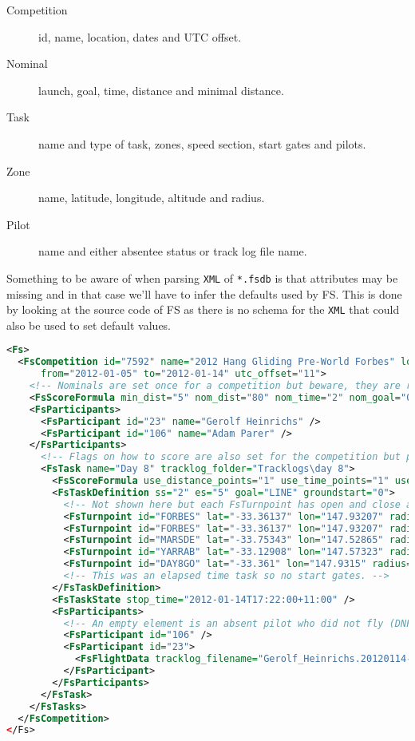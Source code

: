 \documentclass[gap.tex]{subfiles}
\begin{document}
\begin{description}
    \item[Competition] id, name, location, dates and UTC offset.
    \item[Nominal] launch, goal, time, distance and minimal distance.
    \item[Task] name and type of task, zones, speed section, start gates and pilots.
    \item[Zone] name, latitude, longitude, altitude and radius.
    \item[Pilot] name and either absentee status or track log file name.
\end{description}

Something to be aware of when parsing \texttt{XML} of \texttt{*.fsdb} is that
attributes may be missing and in that case we'll have to infer the defaults
used by FS. This is done by looking at the source code of FS as there is no
schema for the \texttt{XML} that could also be used to set default values.

\begin{lstlisting}[language=XML, caption={Overall *.fsdb structure, filtered for input.}]
<Fs>
  <FsCompetition id="7592" name="2012 Hang Gliding Pre-World Forbes" location="Forbes, Australia"
      from="2012-01-05" to="2012-01-14" utc_offset="11">
    <!-- Nominals are set once for a competition but beware, they are repeated per task. -->
    <FsScoreFormula min_dist="5" nom_dist="80" nom_time="2" nom_goal="0.2" />
    <FsParticipants>
      <FsParticipant id="23" name="Gerolf Heinrichs" />
      <FsParticipant id="106" name="Adam Parer" />
    </FsParticipants>
      <!-- Flags on how to score are also set for the competition but pick them up from the task. -->
      <FsTask name="Day 8" tracklog_folder="Tracklogs\day 8">
        <FsScoreFormula use_distance_points="1" use_time_points="1" use_departure_points="0" use_leading_points="1" use_arrival_position_points="1" use_arrival_time_points="0" />
        <FsTaskDefinition ss="2" es="5" goal="LINE" groundstart="0">
          <!-- Not shown here but each FsTurnpoint has open and close attributes. -->
          <FsTurnpoint id="FORBES" lat="-33.36137" lon="147.93207" radius="100" />
          <FsTurnpoint id="FORBES" lat="-33.36137" lon="147.93207" radius="10000" />
          <FsTurnpoint id="MARSDE" lat="-33.75343" lon="147.52865" radius="5000" />
          <FsTurnpoint id="YARRAB" lat="-33.12908" lon="147.57323" radius="400" />
          <FsTurnpoint id="DAY8GO" lat="-33.361" lon="147.9315" radius="400" />
          <!-- This was an elapsed time task so no start gates. -->
        </FsTaskDefinition>
        <FsTaskState stop_time="2012-01-14T17:22:00+11:00" />
        <FsParticipants>
          <!-- An empty element is an absent pilot who did not fly (DNF) the task. -->
          <FsParticipant id="106" />
          <FsParticipant id="23">
            <FsFlightData tracklog_filename="Gerolf_Heinrichs.20120114-100859.6405.23.kml" />
          </FsParticipant>
        </FsParticipants>
      </FsTask>
    </FsTasks>
  </FsCompetition>
</Fs>
\end{lstlisting}
\end{document}
